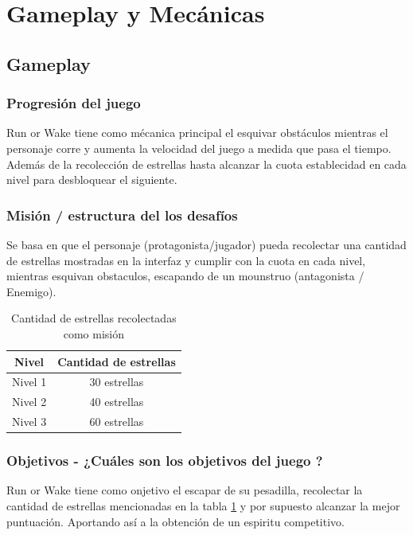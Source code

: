 \section{Gameplay y Mecánicas}
\subsection{Gameplay}
\subsubsection{Progresión del juego}
Run or Wake tiene como mécanica principal el esquivar obstáculos
mientras el personaje corre y aumenta la velocidad del juego a medida
que pasa el tiempo. Además de la recolección de estrellas hasta alcanzar
la cuota establecidad en cada nivel para desbloquear el siguiente.
\subsubsection{Misión / estructura del los desafíos}
Se basa en que el personaje (protagonista/jugador) pueda recolectar una 
cantidad de estrellas mostradas en la interfaz y cumplir con la cuota en cada nivel, mientras
esquivan obstaculos, escapando de un mounstruo (antagonista / Enemigo).

\begin{table}[!ht]
  \begin{center}
    \begin{tabular}{| c | c |}
      \hline
      Nivel & Cantidad de estrellas \\ \hline
      Nivel 1 & 30 estrellas \\ \hline
      Nivel 2 & 40 estrellas \\ \hline
      Nivel 3 & 60 estrellas \\ \hline
    \end{tabular}
    \caption{Cantidad de estrellas recolectadas como misión}
    \label{tab:estrellas}
  \end{center}
\end{table}

\subsubsection{ Objetivos - ¿Cuáles son los objetivos del juego ?}
Run or Wake tiene como onjetivo el escapar de su pesadilla, recolectar
la cantidad de estrellas mencionadas en la tabla \ref{tab:estrellas}
y por supuesto alcanzar la mejor puntuación. Aportando así a la obtención
de un espiritu competitivo.

